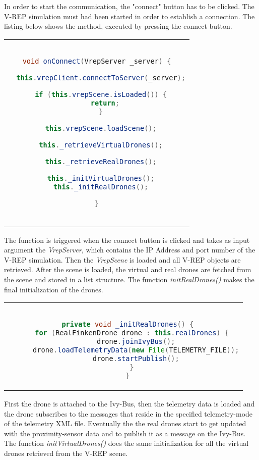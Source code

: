 In order to start the communication, the "connect" button has to be clicked. The V-REP simulation must had been started in order to establish a connection. The listing below shows the method, executed by pressing the connect button.

\begin{center}
\begin{tabular}{c}
\begin{lstlisting}[basicstyle=\small, language=Java]

void onConnect(VrepServer _server) {

  this.vrepClient.connectToServer(_server);

  if (this.vrepScene.isLoaded()) {
    return;
  }

  this.vrepScene.loadScene();

  this._retrieveVirtualDrones();

  this._retrieveRealDrones();

  this._initVirtualDrones();
  this._initRealDrones();

}
        
\end{lstlisting}
\end{tabular}
\end{center}

The function is triggered when the connect button is clicked and takes as input argument the \textit{VrepServer}, which contains the IP Address and port number of the V-REP simulation. Then the \textit{VrepScene} is loaded and all V-REP objects are retrieved. After the scene is loaded, the virtual and real drones are fetched from the scene and stored in a list structure. The function \textit{initRealDrones()} makes the final initialization of the drones.

\begin{center}
\begin{tabular}{c}
\begin{lstlisting}[basicstyle=\small, language=Java]

  private void _initRealDrones() {
    for (RealFinkenDrone drone : this.realDrones) {
      drone.joinIvyBus();
      drone.loadTelemetryData(new File(TELEMETRY_FILE));
      drone.startPublish();
    }
  }

\end{lstlisting}
\end{tabular}
\end{center}

First the drone is attached to the Ivy-Bus, then the telemetry data is loaded and the drone subscribes to the messages that reside in the specified telemetry-mode of the telemetry XML file. Eventually the the real drones start to get updated with the proximity-sensor data and to publish it as a message on the Ivy-Bus. The function \textit{initVirtualDrones()} does the same initialization for all the virtual drones retrieved from the V-REP scene.




